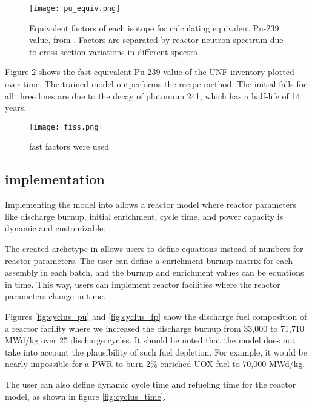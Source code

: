 \begin{figure}
    \centering
    \texttt{[image: pu\_equiv.png]}
    \caption{Equivalent factors of each isotope for
             calculating equivalent Pu-239 value,
             from \cite{anon_plutonium_1989}. Factors
             are separated by reactor neutron spectrum
             due to cross section variations in different
             spectra.}
    \label{fig:pu_equiv}
\end{figure}

Figure \ref{fig:fiss} shows the fast equivalent Pu-239
value of the \gls{UNF} inventory plotted over time.
The trained model outperforms the recipe method. The
initial falls for all three lines are due to the
decay of plutonium 241, which has a half-life of
14 years.

\begin{figure}
    \centering
    \texttt{[image: fiss.png]}
    \caption{fast factors were used}
    \label{fig:fiss}
\end{figure}




\subsection{\Cyclus implementation}

Implementing the model into \Cyclus allows a 
reactor model where reactor parameters like discharge
burnup, initial enrichment, cycle time, and power
capacity is dynamic and customizable.

The created archetype in \Cyclus allows users to define
equations instead of numbers for reactor parameters.
The user can define a enrichment burnup matrix for
each assembly in each batch, and the burnup and enrichment
values can be equations in time. This way, users can
implement reactor facilities where the reactor parameters
change in time.

Figures \ref{fig:cyclus_pu}
and \ref{fig:cyclus_fp} show the discharge fuel composition
of a reactor facility where we increased the discharge burnup
from 33,000 to 71,710 MWd/kg over 25 discharge cycles.
It should be noted that the model does not take into account
the plausibility of such fuel depletion. For example, it
would be nearly impossible for a  \gls{PWR} to burn 2\%
enriched \gls{UOX} fuel to 70,000 MWd/kg.

The user can also define dynamic
cycle time and refueling time for the reactor model, as shown
in figure \ref{fig:cyclus_time}.



